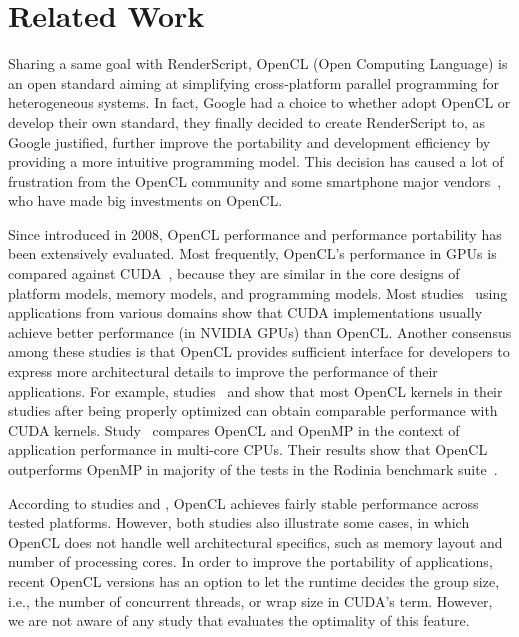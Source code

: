 \section{Related Work}

Sharing a same goal with RenderScript, OpenCL (Open Computing Language)
\cite{OpenCL} is an open standard aiming at simplifying cross-platform
parallel programming for heterogeneous systems. In fact, Google had a choice to
whether adopt OpenCL or develop their own standard, they finally decided to
create RenderScript to, as Google justified, further improve the
portability and development efficiency by providing a more intuitive programming
model. This decision has caused a lot of frustration from the OpenCL community
\cite{androidblockopenCL} and some smartphone major vendors~\cite{googlelockin},
who have made big investments on OpenCL.

Since introduced in 2008, OpenCL performance and performance portability has
been extensively evaluated. Most frequently, OpenCL's performance in GPUs is
compared against CUDA~\cite{fang2011comprehensive, weber2011comparing,
van2011correlating, vassilev2010comparison, amorim2009comparing,
karimi2010performance, komatsu2010evaluating}, because they are similar in the
core designs of platform models, memory models, and programming models.  Most
studies~\cite{weber2011comparing, van2011correlating, vassilev2010comparison,
amorim2009comparing} using applications from various domains show that
CUDA implementations usually achieve better performance (in NVIDIA GPUs) than
OpenCL. Another consensus among these studies is that OpenCL provides sufficient
interface for developers to express more architectural details to improve the
performance of their applications. For example,
studies~\cite{komatsu2010evaluating} and \cite{fang2011comprehensive} show that
most OpenCL kernels in their studies after being properly optimized can obtain
comparable performance with CUDA kernels.  Study~\cite{shen2012performance}
compares OpenCL and OpenMP in the context of application performance in
multi-core CPUs. Their results show that OpenCL outperforms OpenMP in
majority of the tests in the Rodinia benchmark suite~\cite{che2009rodinia}.

According to studies \cite{komatsu2010evaluating} and \cite{dolbeau2013one},
OpenCL achieves fairly stable performance across tested platforms. However, both
studies also illustrate some cases, in which OpenCL does not handle
well architectural specifics, such as memory layout and number of processing
cores. In order to improve the portability of applications, recent OpenCL
versions has an option to let the runtime decides the group size, i.e., the
number of concurrent threads, or wrap size in CUDA's term. However, we are not
aware of any study that evaluates the optimality of this feature.

